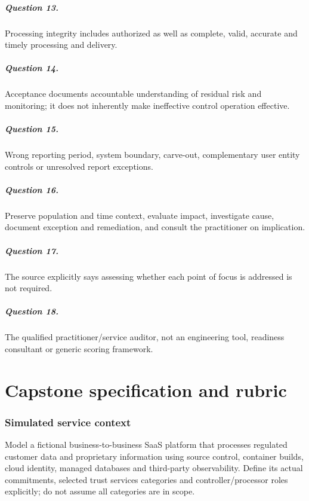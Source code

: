 \documentclass[10pt,oneside]{report}
\begin{document}
\paragraph{Question 13.} Processing integrity includes authorized as well as complete, valid, accurate and timely processing and delivery.

\paragraph{Question 14.} Acceptance documents accountable understanding of residual risk and monitoring; it does not inherently make ineffective control operation effective.

\paragraph{Question 15.} Wrong reporting period, system boundary, carve-out, complementary user entity controls or unresolved report exceptions.

\paragraph{Question 16.} Preserve population and time context, evaluate impact, investigate cause, document exception and remediation, and consult the practitioner on implication.

\paragraph{Question 17.} The source explicitly says assessing whether each point of focus is addressed is not required.

\paragraph{Question 18.} The qualified practitioner/service auditor, not an engineering tool, readiness consultant or generic scoring framework.

\chapter{Capstone specification and rubric}
\subsection{Simulated service context}
Model a fictional business-to-business SaaS platform that processes regulated customer data and proprietary information using source control, container builds, cloud identity, managed databases and third-party observability. Define its actual commitments, selected trust services categories and controller/processor roles explicitly; do not assume all categories are in scope.
\end{document}
